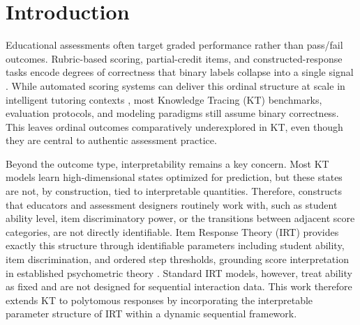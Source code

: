 \documentclass[pdflatex,sn-apa]{sn-jnl}
\begin{document}
\section{Introduction}
Educational assessments often target graded performance rather than pass/fail outcomes. Rubric-based scoring, partial-credit items, and constructed-response tasks encode degrees of correctness that binary labels collapse into a single signal \citep{black_assessment_1998, heritage_formative_2007}.
While automated scoring systems can deliver this ordinal structure at scale in intelligent tutoring contexts \citep{shute_stealth_2011, baral_improving_2021}, most Knowledge Tracing (KT) benchmarks, evaluation protocols, and modeling paradigms still assume binary correctness. This leaves ordinal outcomes comparatively underexplored in KT, even though they are central to authentic assessment practice.


Beyond the outcome type, interpretability remains a key concern. Most KT models learn high-dimensional states optimized for prediction, but these states are not, by construction, tied to interpretable quantities. Therefore, constructs that educators and assessment designers routinely work with, such as student ability level, item discriminatory power, or the transitions between adjacent score categories, are not directly identifiable. Item Response Theory (IRT) provides exactly this structure through identifiable parameters including student ability, item discrimination, and ordered step thresholds, grounding score interpretation in established psychometric theory \citep{van_der_linden_generalized_1997, embretson_irt_2000, messick_validity_1995}. Standard IRT models, however, treat ability as fixed and are not designed for sequential interaction data. This work therefore extends KT to polytomous responses by incorporating the interpretable parameter structure of IRT within a dynamic sequential framework.

\end{document}
